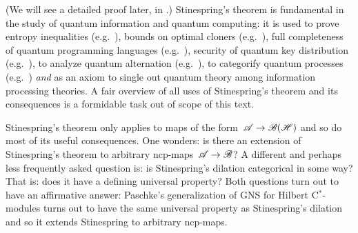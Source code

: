 \documentclass[b]{subfiles}
\begin{document}
\begin{parsec}
\begin{point}%
(We will see a detailed proof later, in .)
Stinespring's theorem
is fundamental in the study
of quantum information and quantum computing:
it is used to prove entropy inequalities (e.g.~\cite{lindblad}),
bounds on optimal cloners (e.g.~\cite{werner}),
full completeness of quantum programming languages (e.g.~\cite{staton}),
security of quantum key distribution (e.g.~\cite{werner2,kissinger2017picture}),
to analyze quantum alternation (e.g.~\cite{prakash}),
to categorify quantum processes (e.g.~\cite{selinger}) \emph{and}
as an axiom to single out
quantum theory among information processing theories.\cite{chiribella}
A fair overview of all uses of Stinespring's theorem and its consequences
is a formidable task out of scope of this text.

Stinespring's theorem only applies
to maps of the form~$\mathscr{A} \to \mathscr{B}(\mathscr{H})$
    and so do most of its useful consequences.
One wonders:
    is there an extension of Stinespring's theorem
    to arbitrary ncp-maps~$\mathscr{A} \to \mathscr{B}$?
A different and perhaps less frequently asked question is:
    is Stinespring's dilation categorical in some way?
That is: does it have a defining universal property?
Both questions turn out to have an affirmative answer:
Paschke's generalization of GNS for Hilbert C$^*$-modules\cite{paschke}
    turns out to have the same universal property
        as Stinespring's dilation and so it extends Stinespring
        to arbitrary ncp-maps.


\end{point}
\end{parsec}
\end{document}
